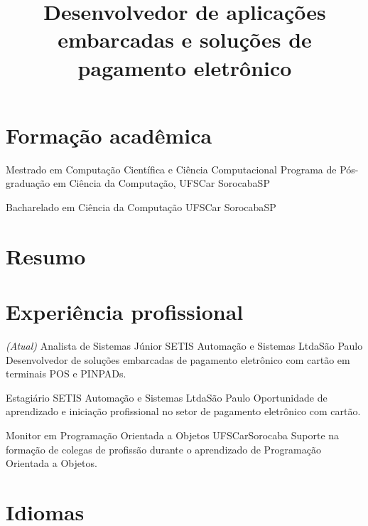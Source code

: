 \documentclass[11pt,a4paper,sans]{moderncv}
\title{\Large Desenvolvedor de aplicações embarcadas e soluções de pagamento
eletrônico}
\begin{document}
\maketitle

\section{Formação acadêmica}

{Mestrado em Computação Científica e Ciência Computacional}
{Programa de Pós-graduação em Ciência da Computação, UFSCar}
{Sorocaba}{SP}{}

{Bacharelado em Ciência da Computação}
{UFSCar}
{Sorocaba}{SP}{}

\section{Resumo}


\section{Experiência profissional}

{\textit{\small{(Atual)}} Analista de Sistemas Júnior}
{SETIS Automação e Sistemas Ltda}{São Paulo}{}
{Desenvolvedor de soluções embarcadas de pagamento eletrônico com cartão em
terminais POS e PINPADs.}

{Estagiário}
{SETIS Automação e Sistemas Ltda}{São Paulo}{}
{Oportunidade de aprendizado e iniciação profissional no setor de pagamento
eletrônico com cartão.}

{Monitor em Programação Orientada a Objetos}
{UFSCar}{Sorocaba}{}
{Suporte na formação de colegas de profissão durante o aprendizado de
Programação Orientada a Objetos.}

\section{Idiomas}

\end{document}
